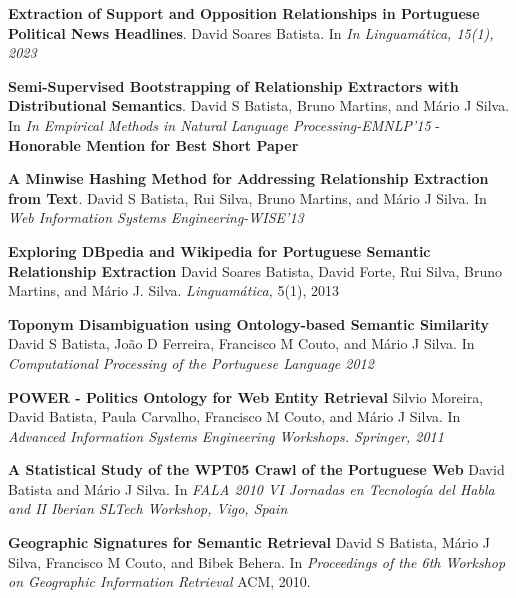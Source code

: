 
\vspace{-5.5mm}

\begin{cventries}

  \cventry
    {} %
    {} %
    {} %
    {} %
    {
      \begin{cvitems} %
        \item {{\bf Extraction of Support and Opposition Relationships in Portuguese Political News Headlines}. David Soares Batista. In {\it In Linguamática, 15(1), 2023}}
  		\vspace{1.0mm}
        \item {{\bf Semi-Supervised Bootstrapping of Relationship Extractors with Distributional Semantics}. David S Batista, Bruno Martins, and Mário J Silva. In {\it In Empirical Methods in Natural Language Processing-EMNLP'15} - {\bf Honorable Mention for Best Short Paper}}
		\vspace{1.0mm}
		\item {{\bf A Minwise Hashing Method for Addressing Relationship Extraction from Text}. David S Batista, Rui Silva, Bruno Martins, and Mário J Silva. In {\it Web Information Systems Engineering-WISE'13}}
		\vspace{1.0mm}
		\item {{\bf Exploring DBpedia and Wikipedia for Portuguese Semantic Relationship Extraction} David Soares Batista, David Forte, Rui Silva, Bruno Martins, and Mário J. Silva. {\it Linguamática,} 5(1), 2013}
		\vspace{1.0mm}
		\item {{\bf Toponym Disambiguation using Ontology-based Semantic Similarity} David S Batista, João D Ferreira, Francisco M Couto, and Mário J Silva. In {\it Computational Processing of the Portuguese Language 2012}}
		\vspace{1.0mm}
		\item {{\bf POWER - Politics Ontology for Web Entity Retrieval} Silvio Moreira, David Batista, Paula Carvalho, Francisco M Couto, and Mário J Silva. In {\it Advanced Information Systems Engineering Workshops. Springer, 2011}}
		\vspace{1.0mm}
		\item {{\bf A Statistical Study of the WPT05 Crawl of the Portuguese Web} David Batista and Mário J Silva. In {\it FALA 2010 VI Jornadas en Tecnología del Habla and II Iberian SLTech Workshop, Vigo, Spain}}
		\vspace{1.0mm}
		\item {{\bf Geographic Signatures for Semantic Retrieval} David S Batista, Mário J Silva, Francisco M Couto, and Bibek Behera. In {\it Proceedings of the 6th Workshop on Geographic Information Retrieval} ACM, 2010.}		
      \end{cvitems}
    }
\end{cventries}



